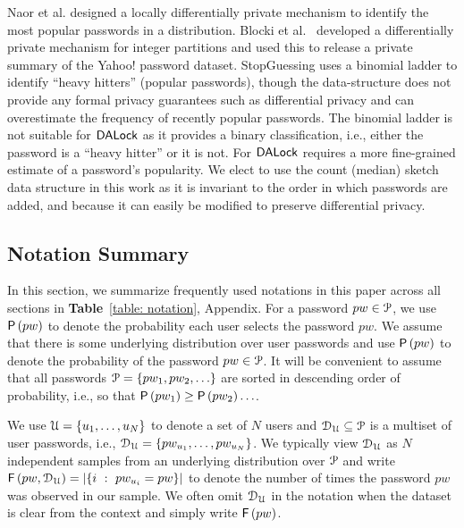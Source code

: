  Naor et al.\cite{CCS:NaoPinRon19} designed a locally differentially private mechanism to identify the most popular passwords in a distribution. Blocki et al.~\cite{NDSS:BloDatBon16} developed a differentially private mechanism for integer partitions and used this to release a private summary of the Yahoo! password dataset. StopGuessing\cite{EuroSP:THS19} uses a binomial ladder to identify ``heavy hitters'' (popular passwords), though the data-structure does not provide any formal privacy guarantees such as differential privacy and can overestimate the frequency of recently popular passwords. The binomial ladder is not suitable for $\mathsf{DALock}$ as it provides a binary classification, i.e., either the password is a ``heavy hitter'' or it is not. For $\mathsf{DALock}$ requires a more fine-grained estimate of a password’s popularity. We elect to use the count (median) sketch~\cite{ICALP:ChaCheFar02} data structure in this work as it is invariant to the order in which passwords are added, and because it can easily be modified to preserve differential privacy. 

\vspace*{-\baselineskip}
\subsection{Notation Summary}
\vspace*{-\baselineskip}
In this section, we summarize frequently used notations in this paper across all sections in \textbf{Table}~\ref{table: notation}, Appendix.  For a password $pw \in \mathcal{P}$, we use $\mathsf{P}\left(pw\right)$ to denote the probability each user selects the password $pw$. We assume that there is some underlying distribution over user passwords and use $\mathsf{P}\left(pw\right)$ to denote the probability of the password $pw \in \mathcal{P}$. It will be convenient to assume that all passwords $ \mathcal{P} = \{pw_1,pw_2,\ldots \}$ are sorted in descending order of probability, i.e., so that $\mathsf{P}\left(pw_1\right) \geq \mathsf{P}\left(pw_2\right) \ldots $. %


We use $\mathcal{U} = \{u_1,\ldots,u_N\}$ to denote a set of $N$ users and $\mathcal{D}_{{\mathcal{U}}} \subseteq \mathcal{P}$ is a multiset of user passwords, i.e., $\mathcal{D}_{{\mathcal{U}}} = \{pw_{u_1},\ldots,pw_{u_N}\}$. We typically view $\mathcal{D}_{{\mathcal{U}}}$ as $N$ independent samples from an underlying distribution over $\mathcal{P}$ and write $\mathsf{F}\left(pw, \mathcal{D}_{{\mathcal{U}}} \right)= \left| \left\{ i ~:~pw_{u_i} = pw \right\} \right|$ to denote the number of times the password $pw$ was observed in our sample. We often omit $\mathcal{D}_{{\mathcal{U}}}$ in the notation when the dataset is clear from the context and simply write $\mathsf{F}\left(pw\right)$. 

